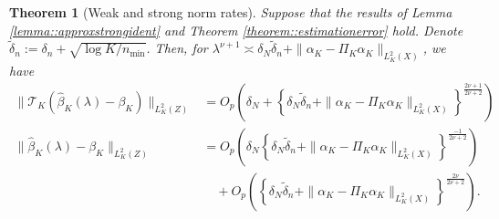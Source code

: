 \documentclass[11pt]{article}
\theoremstyle{plain}
\newtheorem{theorem}{Theorem}
\theoremstyle{definition}
\theoremstyle{remark}
\theoremstyle{definition}
\begin{document}
 

\begin{theorem}[Weak and strong norm rates]
    Suppose that the results of Lemma \ref{lemma::approxstrongident} and Theorem \ref{theorem::estimationerror} hold. Denote $\widetilde{\delta}_n := \delta_n + \sqrt{\log K / n_{\min}}$. Then, for \( \lambda^{\nu + 1} \asymp \delta_N \widetilde{\delta}_n + \|\alpha_K - \Pi_{K} \alpha_K\|_{L^2_K(X)}\), we have
 \begin{align*}
 \|\mathcal{T}_{K}(\widehat{\beta}_K(\lambda) -  \beta_{K})\|_{L^2_K(Z)} &= O_p\left(\delta_N + \left\{ \delta_N \widetilde{\delta}_n + \|\alpha_K - \Pi_{K} \alpha_K\|_{L^2_K(X)} \right\}^{\frac{2\nu +1}{2\nu +2}}\right)\\
     \|\widehat{\beta}_K(\lambda) -  \beta_{K}\|_{L^2_K(Z)} &= O_p\left(\delta_N\left\{ \delta_N \widetilde{\delta}_n + \|\alpha_K - \Pi_{K} \alpha_K\|_{L^2_K(X)} \right\}^{\frac{-1}{2\nu +2}} \right) \\
     & \quad + O_p\left(\left\{ \delta_N \widetilde{\delta}_n + \|\alpha_K - \Pi_{K} \alpha_K\|_{L^2_K(X)} \right\}^{\frac{2\nu}{2\nu +2}}\right).
 \end{align*} 
 \label{theorem::weakstrongrates}
\end{theorem}
\end{document}
